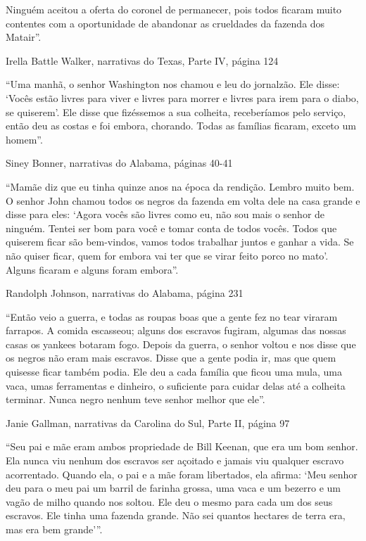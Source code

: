 Ninguém aceitou a oferta do coronel de permanecer, pois todos ficaram
muito contentes com a oportunidade de abandonar as crueldades da fazenda
dos Matair''.

Irella Battle Walker, narrativas do Texas, Parte IV, página 124

``Uma manhã, o senhor Washington nos chamou e leu do jornalzão. Ele
disse: `Vocês estão livres para viver e livres para morrer e livres para
irem para o diabo, se quiserem'. Ele disse que fizéssemos a sua
colheita, receberíamos pelo serviço, então deu as costas e foi embora,
chorando. Todas as famílias ficaram, exceto um homem''.

Siney Bonner, narrativas do Alabama, páginas 40-41

``Mamãe diz que eu tinha quinze anos na época da rendição. Lembro muito
bem. O senhor John chamou todos os negros da fazenda em volta dele na
casa grande e disse para eles: `Agora vocês são livres como eu, não sou
mais o senhor de ninguém. Tentei ser bom para você e tomar conta de
todos vocês. Todos que quiserem ficar são bem-vindos, vamos todos
trabalhar juntos e ganhar a vida. Se não quiser ficar, quem for embora
vai ter que se virar feito porco no mato'. Alguns ficaram e alguns foram
embora''.

Randolph Johnson, narrativas do Alabama, página 231

``Então veio a guerra, e todas as roupas boas que a gente fez no tear
viraram farrapos. A comida escasseou; alguns dos escravos fugiram,
algumas das nossas casas os yankees botaram fogo. Depois da guerra, o
senhor voltou e nos disse que os negros não eram mais escravos. Disse
que a gente podia ir, mas que quem quisesse ficar também podia. Ele deu
a cada família que ficou uma mula, uma vaca, umas ferramentas e
dinheiro, o suficiente para cuidar delas até a colheita terminar. Nunca
negro nenhum teve senhor melhor que ele''.

Janie Gallman, narrativas da Carolina do Sul, Parte II, página 97

``Seu pai e mãe eram ambos propriedade de Bill Keenan, que era um bom
senhor. Ela nunca viu nenhum dos escravos ser açoitado e jamais viu
qualquer escravo acorrentado. Quando ela, o pai e a mãe foram
libertados, ela afirma: `Meu senhor deu para o meu pai um barril de
farinha grossa, uma vaca e um bezerro e um vagão de milho quando nos
soltou. Ele deu o mesmo para cada um dos seus escravos. Ele tinha uma
fazenda grande. Não sei quantos hectares de terra era, mas era bem
grande'''.

